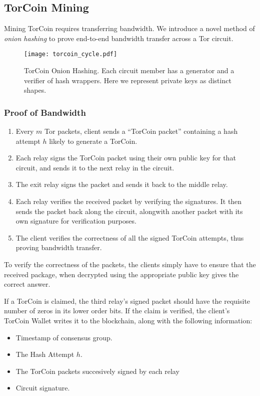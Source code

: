 \subsection{TorCoin Mining}

Mining TorCoin requires transferring bandwidth. We introduce a novel method of
\textit{onion hashing} to prove end-to-end bandwidth transfer across a Tor
circuit.

\begin{figure}[H]
  \centering
    \texttt{[image: torcoin\_cycle.pdf]}
  \caption{TorCoin Onion Hashing. Each circuit member has a generator and a 
  verifier of hash wrappers. Here we represent private keys as distinct shapes.}
\end{figure}

\subsubsection{Proof of Bandwidth}
\begin{enumerate}
\item Every $m$ Tor packets, client sends a ``TorCoin packet'' containing a hash
attempt $h$ likely to generate a TorCoin.
\item Each relay signs the TorCoin packet using their own public key for that circuit, 
and sends it to the next relay in the circuit.
\item The exit relay signs the packet and sends it back to the middle relay.
\item Each relay verifies the received packet by verifying the signatures. It 
then sends the packet back along the circuit, alongwith another packet with its own
signature for verification purposes.
\item The client verifies the correctness of all the signed TorCoin attempts, 
thus proving bandwidth transfer.
\end{enumerate}

To verify the correctness of the packets, the clients simply have to ensure
that the received package, when decrypted using the appropriate public key
gives the correct answer.

If a TorCoin is claimed, the third relay's signed packet should have the
requisite number of zeros in its lower order bits. If the claim is verified,
the client's TorCoin Wallet writes it to the blockchain, along with the
following information:

\begin{itemize}
\item Timestamp of consensus group.
\item The Hash Attempt $h$.
\item The TorCoin packets succesively signed by each relay
\item Circuit signature.
\end{itemize}

